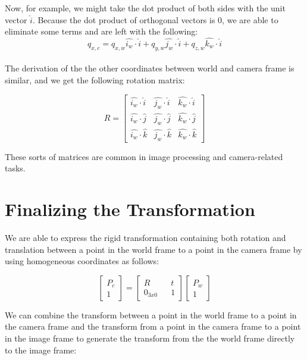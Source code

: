 \documentclass[]{article}
\begin{document}
Now, for example, we might take the dot product of both sides with the unit vector $\hat{i}$. Because the dot product of orthogonal vectors is 0, we are able to eliminate some terms and are left with the following:
\begin{equation}
q_{x,c} = q_{x,w}\hat{i_w} \cdot \hat{i} + q_{y,w}\hat{j_w} \cdot \hat{i} + q_{z,w}\hat{k_w} \cdot \hat{i}
\end{equation}\\
The derivation of the the other coordinates between world and camera frame is similar, and we get the following rotation matrix:

\begin{equation}
R = 
\begin{bmatrix} 
\hat{i_w} \cdot \hat{i} & \hat{j_w} \cdot \hat{i} & \hat{k_w} \cdot \hat{i} \\
\hat{i_w} \cdot \hat{j} & \hat{j_w} \cdot \hat{j} & \hat{k_w} \cdot \hat{j} \\
\hat{i_w} \cdot \hat{k} & \hat{j_w} \cdot \hat{k} & \hat{k_w} \cdot \hat{k}
\end{bmatrix}
\end{equation}

These sorts of matrices are common in image processing and camera-related tasks.

\section{Finalizing the Transformation}
We are able to express the rigid transformation containing both rotation and translation between a point in the world frame to a point in the camera frame by using homogeneous coordinates as follows: 

\begin{equation}
\begin{bmatrix}
P_c \\
1
\end{bmatrix}
=
\begin{bmatrix}
R && t \\
0_{3x0} && 1
\end{bmatrix}
\begin{bmatrix}
P_w \\ 1
\end{bmatrix}
\end{equation}

We can combine the transform between a point in the world frame to a point in the camera frame and the transform from a point in the camera frame to a point in the image frame to generate the transform from the the world frame directly to the image frame:
 
\end{document}
